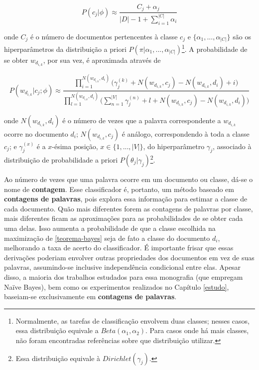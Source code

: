 \begin{equation}
\label{classe2}
\ensuremath{P(c_j | \phi) \approx \frac{C_j + \alpha_j}{|D| - 1 + \sum_{i = 1}^{|C|}\alpha_i}}
\end{equation}

onde \ensuremath{C_j} é o número de documentos pertencentes à classe \ensuremath{c_j} e \ensuremath{\{\alpha_1, ..., \alpha_{|C|}\}} são os hiperparâmetros da distribuição a priori \ensuremath{P(\pi | \alpha_1, ..., \alpha_{|C|})}\footnote{Normalmente, as tarefas de classificação envolvem duas classes; nesses casos, essa distribuição equivale a \ensuremath{Beta(\alpha_1, \alpha_2)}. Para casos onde há mais classes, não foram encontradas referências sobre que distribuição utilizar.}. A probabilidade de se obter \ensuremath{w_{d_{i,k}}}, por sua vez, é aproximada através de
 
\begin{equation}
\label{palavra}
\ensuremath{P(w_{d_{i,k}} | c_j ; \phi) \approx \frac{\prod_{i = 1}^{N(w_{d_{i,k}}, d_i)}\bigg(\gamma_{j}^{(k)} + N(w_{d_{i,k}}, c_j) - N(w_{d_{i,k}}, d_i) + i\bigg) }{\prod_{l = 1}^{N(w_{d_{i,k}}, d_i)}\bigg(\sum_{n = 1}^{|V|}\gamma_{j}^{(n)} + l + N(w_{d_{i,k}}, c_j) - N(w_{d_{i,k}}, d_i)\bigg)}}
\end{equation}

onde \ensuremath{N(w_{d_{i,k}}, d_i)} é o número de vezes que a palavra correspondente a \ensuremath{w_{d_{i,k}}} ocorre no documento \ensuremath{d_i}; \ensuremath{N(w_{d_{i,k}}, c_j)} é análogo, correspondendo à toda a classe \ensuremath{c_j}; e \ensuremath{\gamma_{j}^{(x)}} é a \ensuremath{x}-ésima posição, \ensuremath{x \in \{1, ..., |V|\}}, do hiperparâmetro \ensuremath{\gamma_j}, associado à distribuição de probabilidade a priori \ensuremath{P(\theta_j | \gamma_j)}\footnote{Essa distribuição equivale à \ensuremath{Dirichlet(\gamma_j)}.}.

Ao número de vezes que uma palavra ocorre em um documento ou classe, dá-se o nome de \textbf{contagem}. Esse classificador é, portanto, um método baseado em \textbf{contagens de palavras}, pois explora essa informação para estimar a classe de cada documento. Quão mais diferentes forem as contagens de palavras por classe, mais diferentes ficam as aproximações para as probabilidades de se obter cada uma delas. Isso aumenta a probabilidade de que a classe escolhida na maximização de \ref{teorema-bayes} seja de fato a classe do documento \ensuremath{d_i}, melhorando a taxa de acerto do classificador. É importante frisar que essas derivações poderiam envolver outras propriedades dos documentos em vez de suas palavras, assumindo-se inclusive independência condicional entre elas. Apesar disso, a maioria dos trabalhos estudados para essa monografia (que empregam Naïve Bayes), bem como os experimentos realizados no Capítulo \ref{estudo}, baseiam-se exclusivamente em \textbf{contagens de palavras}.  


